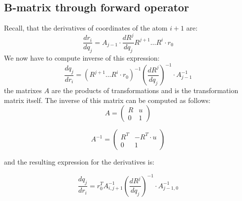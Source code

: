 \subsection{B-matrix through forward operator}
Recall, that the derivatives of coordinates of the atom $i+1$ are:
$$ \frac{dr_i}{dq_j} = A_{j-1}  \cdot \frac{dR^j}{dq_j} R^{j+1} \dots R^{i} \cdot r_0 $$
We now have to compute inverse of this expression:
$$ \frac{dq_j}{dr_i} = \left( R^{j+1} \dots R^{i} \cdot r_0 \right)^{-1} \left(\frac{dR^j}{dq_j}\right)^{-1} \cdot A^{-1}_{j-1}$$
the matrixes $A$ are the products of transformations and is the transformation matrix itself.
The inverse of this matrix can be computed as follows:
$$A = \left(\begin{array}{cc}
R & u \\
0 & 1
\end{array}\right)$$

$$A^{-1} = \left(\begin{array}{cc}
R^T & -R^T \cdot u \\
0 & 1
\end{array}\right)$$

and the resulting expression for the derivatives is:

$$ \frac{dq_j}{dr_i} = r^T_0 A^{-1}_{i, j+1} \left(\frac{dR^j}{dq_j}\right)^{-1} \cdot A^{-1}_{j-1, 0}$$